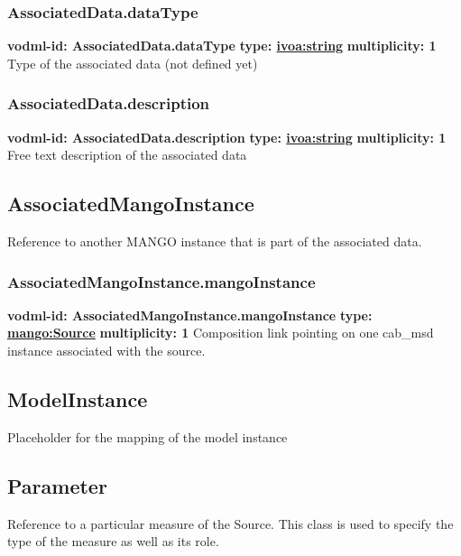     \subsubsection{AssociatedData.dataType}
      \textbf{vodml-id: AssociatedData.dataType} \newline
      \textbf{type: \hyperref[sect:ivoa]{ivoa:string}} \newline
      \textbf{multiplicity: 1} \newline 
      Type of the associated data (not defined yet)

    \subsubsection{AssociatedData.description}
      \textbf{vodml-id: AssociatedData.description} \newline
      \textbf{type: \hyperref[sect:ivoa]{ivoa:string}} \newline
      \textbf{multiplicity: 1} \newline 
      Free text description of the associated data

  \subsection{AssociatedMangoInstance}
  \label{sect:AssociatedMangoInstance}
    Reference to another MANGO instance that is part of the associated data.

    \subsubsection{AssociatedMangoInstance.mangoInstance}
      \textbf{vodml-id: AssociatedMangoInstance.mangoInstance} \newline
      \textbf{type: \hyperref[sect:Source]{mango:Source}} \newline
      \textbf{multiplicity: 1} \newline 
      Composition link pointing on one cab\_msd instance associated with the source.

  \subsection{ModelInstance}
  \label{sect:ModelInstance}
    Placeholder for the mapping of the model instance

  \subsection{Parameter}
  \label{sect:Parameter}
    Reference to a particular measure of the Source. This class is used to specify the type of the measure as well as its role.

